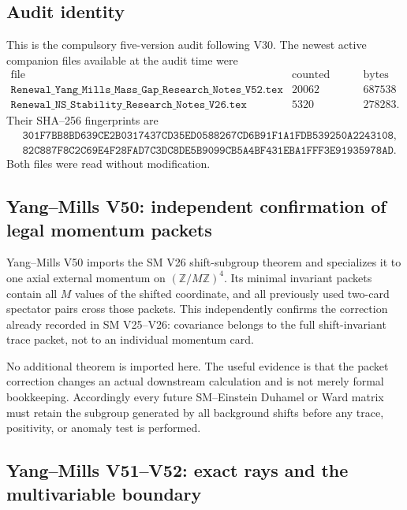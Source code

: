 \documentclass[11pt]{article}
\theoremstyle{remark}
\begin{document}
\subsection{Audit identity}

This is the compulsory five-version audit following V30.  The newest
active companion files available at the audit time were
\[
\begin{array}{c|r|r}
\text{file}&\text{counted lines}&\text{bytes}\\ \hline
\texttt{Renewal\_Yang\_Mills\_Mass\_Gap\_Research\_Notes\_V52.tex}
 &20062&687538\\
\texttt{Renewal\_NS\_Stability\_Research\_Notes\_V26.tex}
 &5320&278283.
\end{array}                                                   \tag{35.1}
\]
Their SHA--256 fingerprints are
\[
\begin{split}
 &\texttt{301F7BB8BD639CE2B0317437CD35ED0588267CD6B91F1A1FDB539250A2243108},
 \\
 &\texttt{82C887F8C2C69E4F28FAD7C3DC8DE5B9099CB5A4BF431EBA1FFF3E91935978AD}.
\end{split}                                                   \tag{35.2}
\]
Both files were read without modification.

\subsection{Yang--Mills V50: independent confirmation of legal
momentum packets}

Yang--Mills V50 imports the SM V26 shift-subgroup theorem and
specializes it to one axial external momentum on
\((\mathbb Z/M\mathbb Z)^4\).  Its minimal invariant packets contain
all \(M\) values of the shifted coordinate, and all previously used
two-card spectator pairs cross those packets.  This independently
confirms the correction already recorded in SM V25--V26: covariance
belongs to the full shift-invariant trace packet, not to an
individual momentum card.

No additional theorem is imported here.  The useful evidence is that
the packet correction changes an actual downstream calculation and
is not merely formal bookkeeping.  Accordingly every future
SM--Einstein Duhamel or Ward matrix must retain the subgroup generated
by all background shifts before any trace, positivity, or anomaly
test is performed.

\subsection{Yang--Mills V51--V52: exact rays and the multivariable
boundary}
\end{document}
